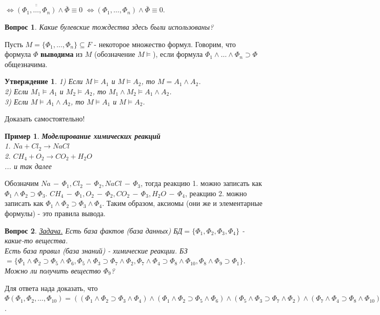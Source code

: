 \documentclass{article}
\newtheorem{example}{Пример}
\newtheorem{question}{Вопрос}
\newtheorem{proposition}{Утверждение}
\numberwithin{example}{section}
\numberwithin{question}{section}
\numberwithin{Remark}{section}
\numberwithin{theorem}{section}
\numberwithin{definition}{section}
\numberwithin{proposition}{section}
\begin{document}
$\Leftrightarrow \overline{\overline{(\Phi_1,\ldots,\Phi_n)}}\wedge \bar{\Phi}\equiv 0$ $\Leftrightarrow(\Phi_1,\ldots,\Phi_n)\wedge \bar{\Phi}\equiv 0$.
\begin{question}
	Какие булевские тождества здесь были использованы?
\end{question}
Пусть $M=\{\Phi_1,\ldots,\Phi_n \}\subseteq F$ - некоторое множество формул. Говорим, что формула $\Phi$ \textbf{выводима} из $M$ (обозначение $M\models$), если формула $\Phi_1\wedge\ldots\wedge\Phi_n\supset \Phi$ общезначима.
\begin{proposition}
1) Если $M\models A_1$ и $M\models A_2$, то $M=A_1\wedge A_2$.\\
2) Если $M_1\models A_1$ и $M_2\models A_2$, то $M_1\wedge M_2\models A_1\wedge A_2$.\\
3) Если $M\models A_1\wedge A_2$, то $M\models A_1$ и $M\models A_2$.
\end{proposition} 
Доказать самостоятельно!
\begin{example}
\textbf{Моделирование химических реакций}\\
1. $Na+Cl_2\to NaCl$\\
2. $CH_4+O_2\to CO_2+H_2O$\\
... и так далее
\end{example}
Обозначим $Na\,-\,\Phi_1,Cl_2\,-\,\Phi_2,NaCl\,-\,\Phi_3$, тогда реакцию 1. можно записать как $\Phi_1\wedge \Phi_2\supset \Phi_3$. $CH_4\,-\,\Phi_1,O_2\,-\,\Phi_2,CO_2\,-\,\Phi_3,H_2O\,-\,\Phi_4$, реакцию 2. можно записать как $\Phi_1\wedge \Phi_2\supset \Phi_3\wedge \Phi_4$. Таким образом, аксиомы (они же и элементарные формулы) - это правила вывода.
\begin{question}
\underline{Задача.} Есть база фактов (база данных) БД$=\{\Phi_1,\Phi_2,\Phi_3,\Phi_4 \}$ - какие-то вещества. \\
Есть база правил (база знаний) - химические реакции. БЗ$=\{\Phi_1\wedge\Phi_2\supset \Phi_5\wedge\Phi_6,\Phi_5\wedge\Phi_3\supset \Phi_7\wedge\Phi_2,\Phi_7\wedge\Phi_4\supset \Phi_8\wedge\Phi_{10},\Phi_8\wedge\Phi_9\supset \Phi_1\}$.\\
Можно ли получить вещество $\Phi_9$?
\end{question}
Для ответа нада доказать, что $\Phi(\Phi_1,\Phi_2,\ldots,\Phi_{10})=((\Phi_1\wedge \Phi_2\supset \Phi_3\wedge \Phi_4)\wedge(\Phi_1\wedge\Phi_2\supset \Phi_5\wedge\Phi_6)\wedge(\Phi_5\wedge\Phi_3\supset \Phi_7\wedge\Phi_2)\wedge(\Phi_7\wedge\Phi_4\supset \Phi_8\wedge\Phi_{10})\wedge(\Phi_8\wedge\Phi_9\supset \Phi_1))\supset \Phi_9\equiv 1$.\\
\end{document}
